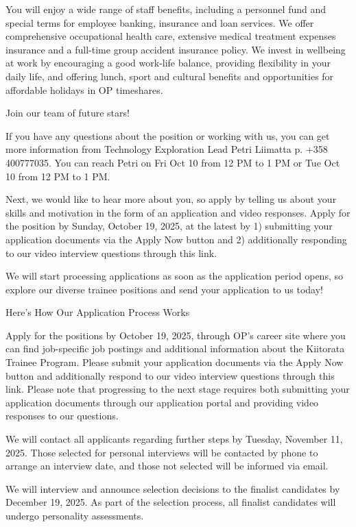 \documentclass[a4paper,11pt]{article}
\begin{document}
You will enjoy a wide range of staff benefits, including a personnel fund and special terms for employee banking, insurance and loan services. We offer comprehensive occupational health care, extensive medical treatment expenses insurance and a full-time group accident insurance policy. We invest in wellbeing at work by encouraging a good work-life balance, providing flexibility in your daily life, and offering lunch, sport and cultural benefits and opportunities for affordable holidays in OP timeshares.

Join our team of future stars!

If you have any questions about the position or working with us, you can get more information from Technology Exploration Lead Petri Liimatta p. +358 400777035. You can reach Petri on Fri Oct 10 from 12 PM to 1 PM or Tue Oct 10 from 12 PM to 1 PM.

Next, we would like to hear more about you, so apply by telling us about your skills and motivation in the form of an application and video responses. Apply for the position by Sunday, October 19, 2025, at the latest by 1) submitting your application documents via the Apply Now button and 2) additionally responding to our video interview questions through this link.

We will start processing applications as soon as the application period opens, so explore our diverse trainee positions and send your application to us today!

Here's How Our Application Process Works

Apply for the positions by October 19, 2025, through OP's career site where you can find job-specific job postings and additional information about the Kiitorata Trainee Program. Please submit your application documents via the Apply Now button and additionally respond to our video interview questions through this link. Please note that progressing to the next stage requires both submitting your application documents through our application portal and providing video responses to our questions.

We will contact all applicants regarding further steps by Tuesday, November 11, 2025. Those selected for personal interviews will be contacted by phone to arrange an interview date, and those not selected will be informed via email.

We will interview and announce selection decisions to the finalist candidates by December 19, 2025. As part of the selection process, all finalist candidates will undergo personality assessments.
\end{document}
